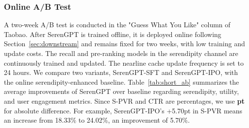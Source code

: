 \subsubsection{Online A/B Test}\label{sec:short_ab}
A two-week A/B test is conducted in the "Guess What You Like" column of Taobao. After SerenGPT is trained offline, it is deployed online following Section~\ref{sec:downstream} and remains fixed for two weeks, with low training and update costs. The recall and pre-ranking models in the serendipity channel are continuously trained and updated. The nearline cache update frequency is set to 24 hours. We compare two variants, SerenGPT-SFT and SerenGPT-IPO, with the online serendipity-enhanced baseline. Table~\ref{tab:short_ab} summarizes the average improvements of SerenGPT over baseline regarding serendipity, utility, and user engagement metrics. Since S-PVR and CTR are percentages, we use \textbf{pt} for absolute difference. For example, SerenGPT-IPO's +5.70pt in S-PVR means an increase from 18.33\% to 24.02\%, an improvement of 5.70\%.
% 
\begin{table}[h]
    \vspace{-4pt}
    \caption{Online improvement of SerenGPT. Since S-PVR and CTR are percentages, we use percentage points (pt) for absolute improvements and relative improvement (\%) for others.}
    \vspace{-8pt}
    \centering
\label{tab:short_ab}
\vspace{-10pt}
\end{table}

